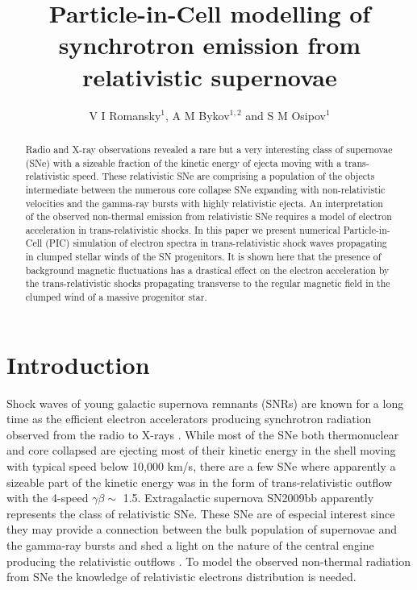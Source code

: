 \documentclass[a4paper]{jpconf}
\begin{document}
\title{Particle-in-Cell modelling of synchrotron emission from relativistic supernovae}

\author{V I Romansky$^{1}$, A M Bykov$^{1,2}$ and S M Osipov$^1$}

\address{$^1$ Ioffe Institute, 26 Politekhnicheskaya st., St. Petersburg 194021, Russia}
\address{$^2$ Peter the Great St. Petersburg Polytechnic University, 29 Politekhnicheskaya st., St. Petersburg 195251, Russia}


\begin{abstract}
Radio and X-ray observations revealed a rare but a very interesting class of supernovae (SNe) with a sizeable fraction of the kinetic  energy of ejecta moving with a trans-relativistic speed.  These relativistic SNe are comprising a population of the objects intermediate between the numerous core collapse SNe expanding with non-relativistic velocities and the gamma-ray bursts with highly relativistic ejecta.  An interpretation of the observed non-thermal emission from relativistic SNe requires a model of electron acceleration in trans-relativistic shocks. In this paper we present numerical Particle-in-Cell (PIC) simulation of electron spectra in trans-relativistic shock waves propagating in clumped stellar winds of the SN progenitors. It is shown here that the presence of background magnetic fluctuations has a drastical effect on the electron acceleration by the trans-relativistic shocks propagating transverse to the regular magnetic field in the clumped wind of a massive progenitor star. 
\end{abstract}
\section{Introduction}


Shock waves of young galactic supernova remnants (SNRs) are known for a long time as the efficient electron accelerators producing synchrotron radiation observed from the radio to X-rays \cite{GS64,Helder12}. While most of the SNe both thermonuclear and core collapsed are ejecting most of their kinetic energy in the shell moving with typical speed below 10,000 km/s, there are a few SNe 
where apparently a sizeable part of the kinetic energy was in the form of trans-relativistic outflow with the 4-speed $\gamma \beta \sim$ 1.5. Extragalactic supernova SN2009bb \cite{2010Natur.463..513S}  apparently represents the class of relativistic SNe. These SNe are of especial interest since they may provide a connection between the bulk population of supernovae and the gamma-ray bursts and shed a light on the nature of the central engine producing the relativistic outflows \cite{Margutti2014,2016ApJ...832..108M}. To model the observed non-thermal radiation from SNe  \cite{1998ApJ...499..810C} the knowledge 
of relativistic electrons distribution is needed.   
\end{document}
